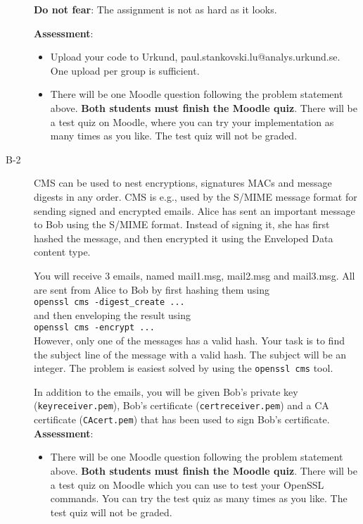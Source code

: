 \documentclass{article}
\begin{document}
\begin{description}
{    \textbf{Do not fear}: The assignment is not as hard as it looks.
    
	\textbf{Assessment}:
	\begin{itemize}
		\item Upload your code to Urkund, paul.stankovski.lu@analys.urkund.se.
        One upload per group is sufficient.
        
		\item There will be one Moodle question following the problem statement above. 
        \textbf{Both students must finish the Moodle quiz}.
        There will be a test quiz on Moodle, where you can try your implementation as many times as you like. 
        The test quiz will not be graded.
	\end{itemize}
    }

	\item[B-2]{CMS can be used to nest encryptions, signatures MACs and message digests in any order. CMS is e.g., used by the S/MIME message format for sending signed and encrypted emails. Alice has sent an important message to Bob using the S/MIME format. Instead of signing it, she has first hashed the message, and then encrypted it using the Enveloped Data content type.
    
You will receive 3 emails, named mail1.msg, mail2.msg and mail3.msg. All are sent from Alice to Bob by first hashing them using \\ \texttt{openssl cms -digest\_create ...}\\ and then enveloping the result using \\\texttt{openssl cms -encrypt ...}\\However, only one of the messages has a valid hash. Your task is to find the subject line of the message with a valid hash. The subject will be an integer. The problem is easiest solved by using the \texttt{openssl cms} tool.

In addition to the emails, you will be given Bob's private key (\texttt{keyreceiver.pem}), Bob's certificate (\texttt{certreceiver.pem}) and a CA certificate (\texttt{CAcert.pem}) that has been used to sign Bob's certificate.\\
    \textbf{Assessment}:
	\begin{itemize}
		\item There will be one Moodle question following the problem statement above. \textbf{Both students must finish the Moodle quiz}.
        There will be a test quiz on Moodle which you can use to test your OpenSSL commands. You can try the test quiz as many times as you like. The test quiz will not be graded.
	\end{itemize}}


\end{description}
\end{document}
